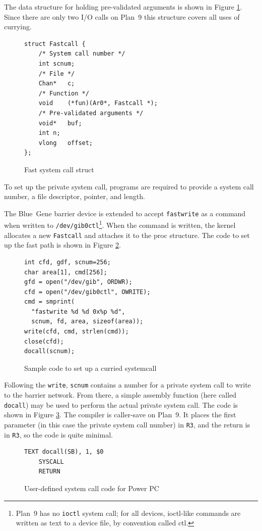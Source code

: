 \documentclass[a4,10pt,preprint]{sigplanconf}
\begin{document}
The data structure for holding pre-validated arguments is shown in Figure \ref{scstruct}. Since there are only two I/O calls on Plan~9 this structure covers all uses of currying. 

\begin{figure}
\begin{verbatim}
struct Fastcall {
	/* System call number */
	int	scnum;
	/* File */
	Chan*	c;
	/* Function */
	void	(*fun)(Ar0*, Fastcall *);
	/* Pre-validated arguments */
	void*	buf;
	int	n;
	vlong	offset;
};
\end{verbatim}
\caption{\label{scstruct}Fast system call struct}
\end{figure}

To set up the private system call, programs are required to provide a system call number, a file descriptor, pointer, and length.

The Blue~Gene barrier device is extended to accept {\tt fastwrite} as a command when written to {\tt /dev/gib0ctl}\footnote{Plan~9 has no {\tt ioctl} system call; for all devices, ioctl-like commands 
are written as text to a device file, by convention called ctl.}. When the command is written, the kernel allocates a new {\tt Fastcall} and attaches it to the proc structure. The code to set up the fast path is shown in Figure \ref{code}.
\begin{figure}
\begin{verbatim}
int cfd, gdf, scnum=256;
char area[1], cmd[256];
gfd = open("/dev/gib", ORDWR);
cfd = open("/dev/gib0ctl", OWRITE);
cmd = smprint(
  "fastwrite %d %d 0x%p %d", 
  scnum, fd, area, sizeof(area));
write(cfd, cmd, strlen(cmd));
close(cfd);
docall(scnum);
\end{verbatim}
\caption{\label{code}Sample code to set up a curried systemcall}
\end{figure}

Following the {\tt write}, {\tt scnum} contains a number for a private system call to write to the barrier network. From there, a simple assembly function (here called {\tt docall}) may be used to perform the actual private system call. The code is shown in Figure \ref{docall}. The compiler is caller-save on Plan~9. It places the first parameter (in this case the private system call number) in {\tt R3}, and the return is in {\tt R3}, so
the code is quite minimal. 

\begin{figure}
\begin{verbatim}
TEXT docall(SB), 1, $0
    SYSCALL
    RETURN
\end{verbatim}
\caption{\label{docall}User-defined system call code for Power PC}
\end{figure}
\end{document}
